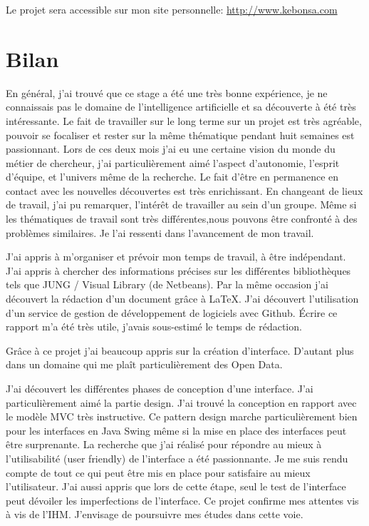 \documentclass[french]{article}
\begin{document}
    Le projet sera accessible sur mon site personnelle:
     \url{http://www.kebonsa.com}


\section{Bilan}
En général, j'ai trouvé que ce stage a été une très bonne expérience, je ne connaissais pas le domaine de l'intelligence 
artificielle et sa découverte à été très intéressante. Le fait de travailler sur le long terme sur un projet est très 
agréable, pouvoir se focaliser et rester sur la même thématique pendant huit semaines est passionnant. Lors de ces deux mois j'ai eu une certaine vision du monde du métier de chercheur,
j'ai particulièrement aimé l'aspect d'autonomie, l'esprit d'équipe, et l’univers même de la recherche. Le fait d’être en permanence en contact avec les nouvelles découvertes est très 
enrichissant. En changeant de lieux de travail, j'ai pu remarquer, l’intérêt de travailler au sein d'un 
groupe. Même si les thématiques de travail sont très différentes,nous pouvons être confronté 
à des problèmes similaires. Je l'ai ressenti dans l'avancement de mon travail.

J'ai appris à m'organiser et prévoir mon temps de travail, à être
indépendant. J'ai appris à chercher des informations précises sur les différentes bibliothèques tels que JUNG / Visual
Library (de Netbeans). Par la même occasion j'ai découvert la rédaction d'un document grâce à \LaTeX{}. J'ai découvert l'utilisation d'un service de gestion de développement de logiciels avec Github.
Écrire ce rapport m'a été très utile, j'avais sous-estimé le temps de rédaction.

Grâce à ce projet j'ai beaucoup appris sur la création d'interface. 
D’autant plus dans un domaine qui me plaît particulièrement des Open Data.

J'ai découvert les différentes phases de conception d'une interface. J'ai particulièrement aimé la partie design. J'ai trouvé la conception en rapport avec le modèle MVC très instructive. Ce pattern design marche particulièrement bien pour %
les interfaces en Java Swing même si la mise en place des interfaces peut être surprenante.  %
 La recherche que j'ai réalisé pour répondre au mieux à l'utilisabilité (user friendly) de l’interface a été passionnante. Je me suis rendu compte de tout ce qui peut être mis en place pour satisfaire au mieux l'utilisateur. J'ai aussi appris que lors de cette étape, seul le test de l'interface peut dévoiler les imperfections de l'interface. Ce projet confirme mes attentes vis 
à vis de l'IHM. J'envisage de poursuivre mes études dans cette voie. 
\end{document}
